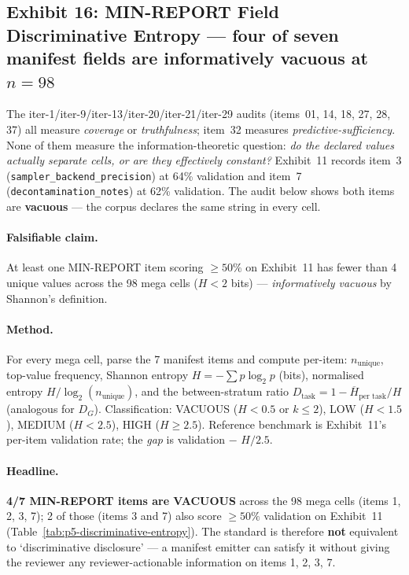 \documentclass{article}  \usepackage[preprint,nonatbib]{neurips_2026} \usepackage[numbers]{natbib}
\providecommand{\tableref}[1]{Table~\ref{#1}}
\begin{document}
\subsection{Exhibit 16: MIN-REPORT Field Discriminative Entropy --- four of seven manifest fields are informatively vacuous at $n{=}98$}
\label{sec:p5-exhibit-discriminative-entropy}
The iter-1/iter-9/iter-13/iter-20/iter-21/iter-29 audits (items~01, 14,
18, 27, 28, 37) all measure \emph{coverage} or \emph{truthfulness};
item~32 measures \emph{predictive-sufficiency}. None of them measure
the information-theoretic question: \emph{do the declared values
actually separate cells, or are they effectively constant?} Exhibit~11
records item~3 (\texttt{sampler\_backend\_precision}) at 64\% validation
and item~7 (\texttt{decontamination\_notes}) at 62\% validation. The
audit below shows both items are \textbf{vacuous} --- the corpus
declares the same string in every cell.

\paragraph{Falsifiable claim.}
At least one MIN-REPORT item scoring $\geq 50\%$ on Exhibit~11 has
fewer than 4 unique values across the 98 mega cells ($H<2$ bits) ---
\emph{informatively vacuous} by Shannon's definition.

\paragraph{Method.}
For every mega cell, parse the 7 manifest items and compute per-item:
$n_\text{unique}$, top-value frequency, Shannon entropy
$H = -\sum p\log_2 p$ (bits), normalised entropy
$H/\log_2(n_\text{unique})$, and the between-stratum ratio
$D_\text{task} = 1 - \overline{H}_\text{per task}/H$ (analogous for
$D_G$). Classification: VACUOUS ($H<0.5$ or $k\le 2$), LOW
($H<1.5$), MEDIUM ($H<2.5$), HIGH ($H\ge 2.5$). Reference benchmark
is Exhibit~11's per-item validation rate; the \emph{gap} is
validation $-$ $H/2.5$.

\paragraph{Headline.}
\textbf{4/7 MIN-REPORT items are VACUOUS} across the 98 mega cells
(items 1, 2, 3, 7); 2 of those (items 3 and 7) also score $\geq 50\%$
validation on Exhibit~11 (\tableref{tab:p5-discriminative-entropy}).
The standard is therefore \textbf{not} equivalent to `discriminative
disclosure' --- a manifest emitter can satisfy it without giving the
reviewer any reviewer-actionable information on items 1, 2, 3, 7.
\end{document}
